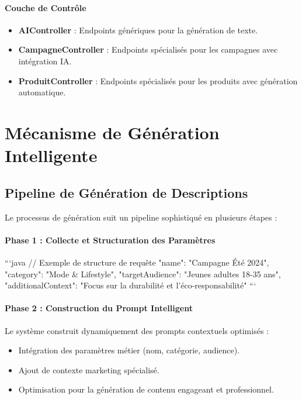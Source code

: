 \paragraph{Couche de Contrôle}
\begin{itemize}[label=\textbullet]
    \item \textbf{AIController} : Endpoints génériques pour la génération de texte.
    \item \textbf{CampagneController} : Endpoints spécialisés pour les campagnes avec intégration IA.
    \item \textbf{ProduitController} : Endpoints spécialisés pour les produits avec génération automatique.
\end{itemize}

\section{Mécanisme de Génération Intelligente}

\subsection{Pipeline de Génération de Descriptions}

Le processus de génération suit un pipeline sophistiqué en plusieurs étapes :

\paragraph{Phase 1 : Collecte et Structuration des Paramètres}
```java
// Exemple de structure de requête
{
  "name": "Campagne Été 2024",
  "category": "Mode & Lifestyle",
  "targetAudience": "Jeunes adultes 18-35 ans",
  "additionalContext": "Focus sur la durabilité et l'éco-responsabilité"
}
```

\paragraph{Phase 2 : Construction du Prompt Intelligent}
Le système construit dynamiquement des prompts contextuels optimisés :
\begin{itemize}[label=\textbullet]
    \item Intégration des paramètres métier (nom, catégorie, audience).
    \item Ajout de contexte marketing spécialisé.
    \item Optimisation pour la génération de contenu engageant et professionnel.
\end{itemize}


